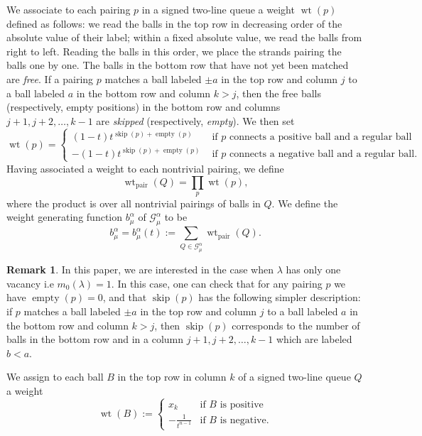 \documentclass[12pt]{amsart}
\theoremstyle{definition}
\newtheorem{remark}[thm]{Remark}
\DeclareMathOperator{\wt}{wt}
\DeclareMathOperator{\skipped}{skip}
\DeclareMathOperator{\emp}{empty}
\DeclareMathOperator{\pair}{pair}
\newcommand{\mcG}{\mathcal{G}}
\begin{document}
We associate to each pairing $p$ in a signed two-line queue a weight $\wt(p)$ defined as follows: we read the balls in the top row in decreasing order of the absolute value of their label; within a fixed absolute value, we read the balls from right to left.  Reading the balls in this order, we place the strands pairing the balls one by one.  The balls in the bottom row that have not yet been matched  are \emph{free}.  If a pairing $p$ matches a ball labeled $\pm a$ in the top row and column $j$ to a ball labeled $a$ in the bottom row and column $k>j$, then the free balls (respectively, empty positions) in the bottom row and columns $j+1,j+2,\dots,k-1$
are  \emph{skipped} (respectively, \emph{empty}).  We then set 
\begin{equation}\label{eq:pair2}
\wt(p) = \begin{cases}
         (1-t) t^{\skipped(p)+\emp(p)} &\text{ if $p$ connects a positive ball and a regular ball}\\
         -(1-t) t^{\skipped(p)+\emp(p)} &\text{ if $p$ connects a negative ball and a regular ball.}
\end{cases}
\end{equation}
Having associated a weight to each nontrivial pairing,
we define $$\wt_{\pair}(Q) = \prod_p \wt(p),$$
where the product is over all nontrivial pairings of balls in $Q$.
We define the weight generating function $b_\mu^\alpha$ of $\mcG^\alpha_\mu$ to be
\begin{equation}\label{eq:generating_function1}
    b_\mu^\alpha=b_\mu^\alpha(t):=\sum_{Q\in\mcG_\mu^\alpha}\wt_{\pair}(Q).
\end{equation}

\begin{remark}
In this paper, we are interested in the case when $\lambda$ has only one vacancy i.e $m_0(\lambda)=1$. In this case, one can check that for any pairing $p$ we have $\emp(p)=0$, and that $\skipped(p)$ has the following simpler description: if  $p$ matches a ball labeled $\pm a$ in the top row and column $j$ to a ball labeled $a$ in the bottom row and column $k>j$, then $\skipped(p)$ corresponds to the number of balls in the bottom row and in a column $j+1,j+2,\dots,k-1$ which are labeled $b<a$.
    
\end{remark}



We assign to each ball $B$ in the top row in column $k$ of a signed two-line queue $Q$ a weight
$$\wt(B):=\begin{cases}
    x_k &\text{if $B$ is positive}\\
    -\frac{1}{t^{n-1}}&\text{if $B$ is negative}.
\end{cases}$$
\end{document}
